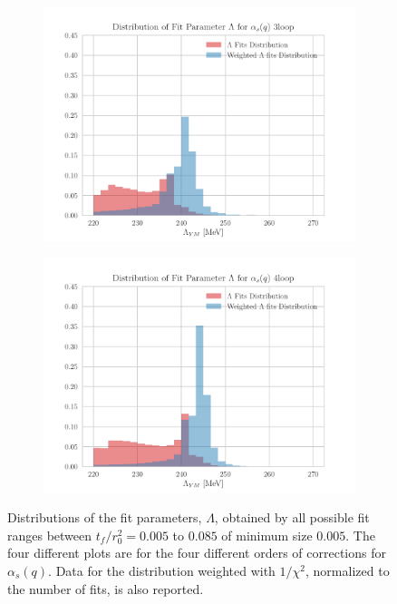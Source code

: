 \begin{figure}[hbt!]
    \begin{subfigure}{0.49\textwidth}
        \centering
        \includegraphics[width=1\textwidth]{results/hist3.pdf}
    \end{subfigure}
    \begin{subfigure}{0.49\textwidth}
        \centering
        \includegraphics[width=1\textwidth]{results/hist4.pdf}        
    \end{subfigure}
    \caption{Distributions of the fit parameters, $\Lambda$, obtained by all possible fit ranges between $t_f/r_0^2 = 0.005$ to $0.085$ of minimum size $0.005$. The four different plots are for the four different orders of corrections for $\alpha_s(q)$. Data for the distribution weighted with $1/\chi^2$, normalized to the number of fits, is also reported.}
    \label{lambda_hist}
\end{figure}

